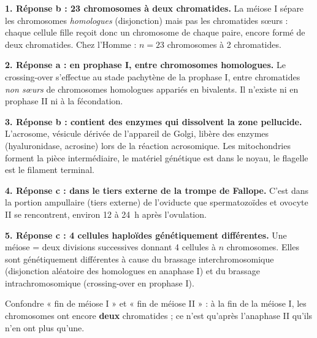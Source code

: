\documentclass[11pt]{article}
\begin{document}
\begin{corrige}
\textbf{1. Réponse b : 23 chromosomes à deux chromatides.} La méiose I sépare les chromosomes \emph{homologues} (disjonction) mais pas les chromatides sœurs : chaque cellule fille reçoit donc un chromosome de chaque paire, encore formé de deux chromatides. Chez l'Homme : $n = 23$ chromosomes à 2 chromatides.

\textbf{2. Réponse a : en prophase I, entre chromosomes homologues.} Le crossing-over s'effectue au stade pachytène de la prophase I, entre chromatides \emph{non sœurs} de chromosomes homologues appariés en bivalents. Il n'existe ni en prophase II ni à la fécondation.

\textbf{3. Réponse b : contient des enzymes qui dissolvent la zone pellucide.} L'acrosome, vésicule dérivée de l'appareil de Golgi, libère des enzymes (hyaluronidase, acrosine) lors de la réaction acrosomique. Les mitochondries forment la pièce intermédiaire, le matériel génétique est dans le noyau, le flagelle est le filament terminal.

\textbf{4. Réponse c : dans le tiers externe de la trompe de Fallope.} C'est dans la portion ampullaire (tiers externe) de l'oviducte que spermatozoïdes et ovocyte II se rencontrent, environ 12 à \SI{24}{h} après l'ovulation.

\textbf{5. Réponse c : 4 cellules haploïdes génétiquement différentes.} Une méiose = deux divisions successives donnant 4 cellules à $n$ chromosomes. Elles sont génétiquement différentes à cause du brassage interchromosomique (disjonction aléatoire des homologues en anaphase I) et du brassage intrachromosomique (crossing-over en prophase I).
\end{corrige}

\begin{attention}
Confondre « fin de méiose I » et « fin de méiose II » : à la fin de la méiose I, les chromosomes ont encore \textbf{deux} chromatides ; ce n'est qu'après l'anaphase II qu'ils n'en ont plus qu'une.
\end{attention}
\end{document}
